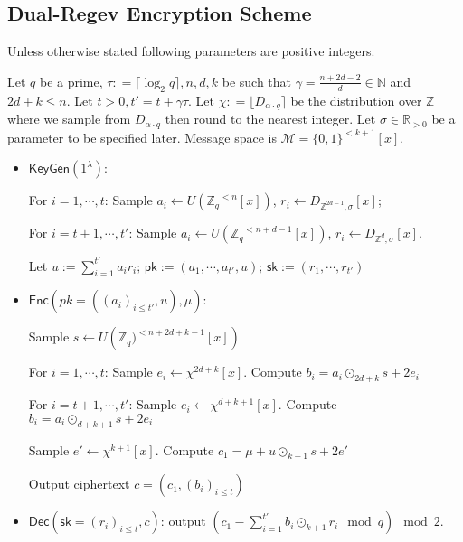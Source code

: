 \documentclass[11pt]{article}
\newcommand{\poly}[2]{{#1}^{<#2}[x]}
\newcommand{\Z}{\mathbb{Z}}
\newcommand{\R}{\mathbb{R}}
\newcommand{\secp}{\lambda}
\newcommand{\KeyGen}{\mathsf{KeyGen}}
\newcommand{\Enc}{\mathsf{Enc}}
\newcommand{\Dec}{\mathsf{Dec}}
\newcommand{\sk}{\mathsf{sk}}
\newcommand{\pk}{\mathsf{pk}}
\begin{document}
\subsection{Dual-Regev Encryption Scheme} \label{subsec:dualRegev}


Unless otherwise stated following parameters are positive integers.

Let $q$ be a prime, $\tau: = \lceil \log_2 q \rceil, n, d, k$ be such that $\gamma = \frac{n+2d-2}{d} \in \mathbb{N}$ and $2d +k \leq n.$ Let $t>0, t'= t+\gamma \tau.$ Let $\chi: =\lfloor D_{\alpha\cdot q} \rceil$ be the distribution over $\Z$ where we sample from $D_{\alpha \cdot q}$ then round to the nearest integer. Let $\sigma \in \R_{> 0}$ be a parameter to be specified later. Message space is $\mathcal{M} = \poly{\{0,1\}}{k+1}.$

\begin{itemize}
\item 
$\KeyGen(1^\secp)$: 

For $i=1, \cdots, t$: Sample $a_i \leftarrow U(\poly{\mathbb{Z}_q}{n})$,  $r_i \leftarrow D_{\mathbb{Z}^{2d-1}, \sigma}[x]$;

For $i=t+1, \cdots ,t'$: Sample $a_i \leftarrow U(\poly{\mathbb{Z}_q}{n+d-1})$,  $r_i \leftarrow D_{\mathbb{Z}^{d}, \sigma}[x]$. 

Let $u:= \sum_{i=1}^{t'} a_i r_i; \, \pk := (a_1,\cdots, a_{t'}, u); \, \sk :=(r_1, \cdots, r_{t'} )$

\item
$\Enc(pk =((a_i)_{i\leq t'}, u),\mu)$: 

Sample $s \leftarrow U(\poly{\mathbb{Z}_q)}{n+2d+k-1})$

For $i=1, \cdots, t$: Sample $e_i \leftarrow \chi^{ 2d+k}[x]. $ Compute $b_i = a_i \odot_{2d+k} s + 2 e_i$

For $i=t+1, \cdots ,t'$: Sample $e_i \leftarrow  \chi^{d+k+1}[x] .$ Compute $b_i = a_i \odot_{d+k+1} s+2e_i$

Sample $e' \leftarrow \chi^{ k+1}[x]. $ Compute $c_1 = \mu + u\odot_{k+1} s + 2e'  $

Output ciphertext $c= (c_1, (b_i)_{i \leq t} )$

\item 
$\Dec(\sk = (r_i)_{i\leq t}, c)$: output $(c_1 - \sum_{i=1}^{t'} b_i \odot_{k+1} r_i \mod q ) \mod 2$. 
\end{itemize}
\end{document}
